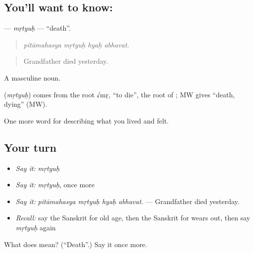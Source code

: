 \subsection*{You'll want to know: }
\textbf{} — \emph{mṛtyuḥ} — \textquotedblleft{}death\textquotedblright{}.

\begin{quote}
   
\end{quote}

\begin{quote}
\emph{pitāmahasya mṛtyuḥ hyaḥ abhavat.}
\end{quote}

\begin{quote}
Grandfather died yesterday.
\end{quote}

A masculine noun.

\begin{cousinweb}
\textbf{} (\emph{mṛtyuḥ}) comes from the root √mṛ, \textquotedblleft{}to die\textquotedblright{}, the root of \textbf{}; MW gives \textquotedblleft{}death, dying\textquotedblright{} (MW).
\end{cousinweb}

\begin{grammarlens}[title={What you've built}]
One more word for describing what you lived and felt.
\end{grammarlens}

\subsection*{Your turn}
\begin{itemize}
\raggedright
  \item \emph{Say it:} \emph{mṛtyuḥ}
  \item \emph{Say it:} \emph{mṛtyuḥ}, once more
  \item \emph{Say it:} \emph{pitāmahasya mṛtyuḥ hyaḥ abhavat.} — Grandfather died yesterday.
  \item \emph{Recall:} say the Sanskrit for old age, then the Sanskrit for wears out, then say \emph{mṛtyuḥ} again
\end{itemize}

\begin{tcolorbox}[breakable,colback=teal!4,colframe=teal!35!black,title={Before you move on}]
What does  mean? (\textquotedblleft{}Death\textquotedblright{}.) Say it once more.
\end{tcolorbox}
